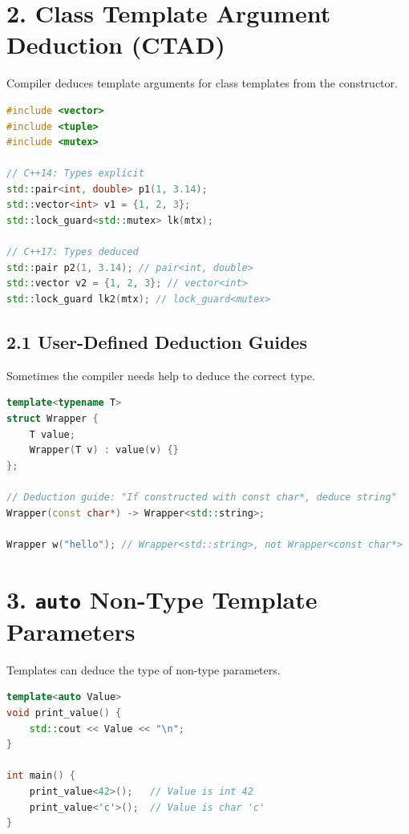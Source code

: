\hypertarget{class-template-argument-deduction-ctad}{%
\section{2. Class Template Argument Deduction
(CTAD)}\label{class-template-argument-deduction-ctad}}

Compiler deduces template arguments for class templates from the
constructor.

\begin{lstlisting}[language={C++}]
#include <vector>
#include <tuple>
#include <mutex>

// C++14: Types explicit
std::pair<int, double> p1(1, 3.14);
std::vector<int> v1 = {1, 2, 3};
std::lock_guard<std::mutex> lk(mtx);

// C++17: Types deduced
std::pair p2(1, 3.14); // pair<int, double>
std::vector v2 = {1, 2, 3}; // vector<int>
std::lock_guard lk2(mtx); // lock_guard<mutex>
\end{lstlisting}

\hypertarget{user-defined-deduction-guides}{%
\subsection{2.1 User-Defined Deduction
Guides}\label{user-defined-deduction-guides}}

Sometimes the compiler needs help to deduce the correct type.

\begin{lstlisting}[language={C++}]
template<typename T>
struct Wrapper {
    T value;
    Wrapper(T v) : value(v) {}
};

// Deduction guide: "If constructed with const char*, deduce string"
Wrapper(const char*) -> Wrapper<std::string>;

Wrapper w("hello"); // Wrapper<std::string>, not Wrapper<const char*>
\end{lstlisting}

\hypertarget{auto-non-type-template-parameters}{%
\section{\texorpdfstring{3. \texttt{auto} Non-Type Template
Parameters}{3. auto Non-Type Template Parameters}}\label{auto-non-type-template-parameters}}

Templates can deduce the type of non-type parameters.

\begin{lstlisting}[language={C++}]
template<auto Value>
void print_value() {
    std::cout << Value << "\n";
}

int main() {
    print_value<42>();   // Value is int 42
    print_value<'c'>();  // Value is char 'c'
}
\end{lstlisting}

